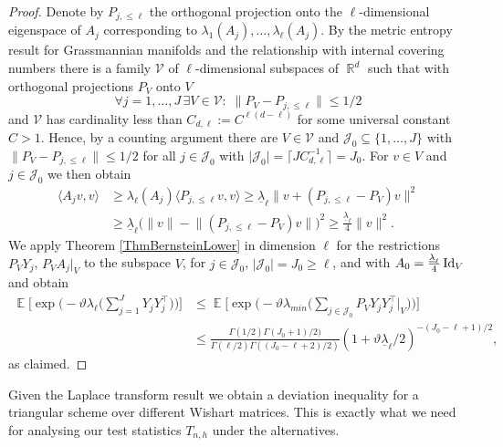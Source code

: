 \documentclass[preprint,aos]{imsart}
\numberwithin{equation}{section}
\theoremstyle{remark}
\DeclareMathOperator{\E}{{\mathbb E}}
\DeclareMathOperator{\R}{{\mathbb R}}
\renewcommand{\theta}{\vartheta}
\renewcommand{\subset}{\subseteq}
\providecommand{\abs}[1]{\lvert #1 \rvert}
\providecommand{\norm}[1]{\lVert #1 \rVert}
\providecommand{\scapro}[2]{\langle #1,#2 \rangle}
\providecommand{\ceil}[1]{\lceil #1 \rceil}
\renewcommand{\le}{\leqslant}
\renewcommand{\ge}{\geqslant}
\begin{document}
\begin{appendix}
\begin{proof}
Denote by $P_{j,\le \ell}$ the orthogonal projection onto the $\ell$-dimensional eigenspace of $A_j$ corresponding to $\lambda_1(A_j),\ldots,\lambda_\ell(A_j)$. By the metric entropy result for Grassmannian manifolds \citep[Proposition 6]{Pajor1998} and the relationship with internal covering numbers there is a family $\mathcal V$ of $\ell$-dimensional subspaces of $\R^d$ such that with orthogonal projections $P_V$ onto $V$
\[ \forall j=1,\ldots,J\,\exists V\in{\mathcal V}:\; \norm{P_V-P_{j,\le\ell}}\le 1/2\]
and $\mathcal V$ has cardinality less than $C_{d,\ell}:=C^{\ell(d-\ell)}$ for some universal constant $C> 1$. Hence, by a counting argument there are $V\in{\mathcal V}$ and ${\mathcal J}_0\subset\{1,\ldots,J\}$ with $\norm{P_V-P_{j,\le\ell}}\le 1/2$ for all $j\in{\mathcal J}_0$ with $\abs{{\mathcal J}_0}= \ceil{JC_{d,\ell}^{-1}}=J_0$. For $v\in V$ and $j\in{\mathcal J}_0$ we then obtain
\begin{align*}
\scapro{A_jv}{v} &\ge \lambda_\ell(A_j)\scapro{P_{j,\le\ell}v}{v}\ge \underline\lambda_\ell \norm{v+(P_{j,\le\ell}-P_V)v}^2\\
& \ge \underline\lambda_\ell \big(\norm{v}-\norm{(P_{j,\le\ell}-P_V)v}\big)^2\ge \tfrac{\underline\lambda_\ell}4\norm{v}^2.
\end{align*}
We apply Theorem \ref{ThmBernsteinLower} in dimension $\ell$ for the restrictions $P_VY_j$, $P_VA_j|_{V}$ to the subspace $V$, for $j\in{\mathcal J}_0$, $\abs{{\mathcal J}_0}=J_0\ge\ell$, and with $A_0=\tfrac{\underline\lambda_\ell}4 \operatorname{Id}_V$ and obtain
\begin{align*}
\E\Big[\exp\Big(-\theta \lambda_{\ell}\Big(\sum_{j=1}^JY_jY_j^\top\Big)\Big)\Big] &\le \E\Big[\exp\Big(-\theta \lambda_{min}\Big(\sum_{j\in{\mathcal J}_0}P_VY_jY_j^\top|_{V}\Big)\Big)\Big]\\
&\le \tfrac{ \Gamma(1/2)\Gamma(J_0+1)/2)} {\Gamma(\ell/2)\Gamma((J_0-\ell+2)/2)} (1+\theta\underline\lambda_\ell/2)^{-(J_0-\ell+1)/2},
\end{align*}
as claimed.
\end{proof}

Given the Laplace transform result we obtain a deviation inequality for a triangular scheme over different Wishart matrices. This is exactly what we need for analysing our test statistics $T_{n,h}$ under the alternatives.


\end{appendix}
\end{document}
